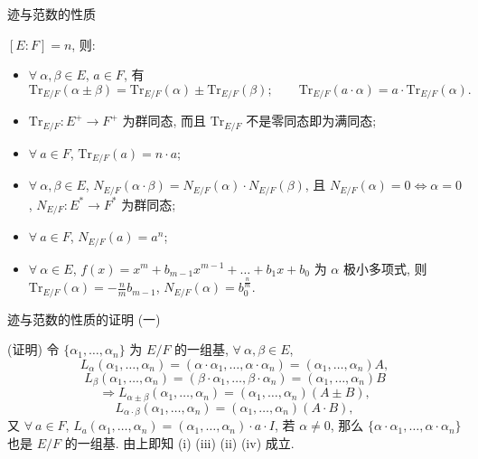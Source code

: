 \begin{frame}{迹与范数的性质}

\begin{lem}[迹与范数的性质]
$[E:F] = n$, 则:
\begin{itemize}
\item[(i)] $\forall\ \alpha, \beta \in E$, $a \in F$, 有
  \[
  \mathrm{Tr}_{E/F}(\alpha \pm \beta) = \mathrm{Tr}_{E/F}(\alpha)
  \pm \mathrm{Tr}_{E/F}(\beta); \qquad
  \mathrm{Tr}_{E/F}(a \cdot \alpha) = a \cdot \mathrm{Tr}_{E/F}(\alpha).
  \]
\item[(ii)] $\mathrm{Tr}_{E/F}: E^{+} \to F^{+}$ 为群同态,
  而且 $\mathrm{Tr}_{E/F}$ 不是零同态即为满同态;
\item[(iii)] $\forall\ a \in F$, $\mathrm{Tr}_{E/F}(a) = n \cdot a$;
\item[(iv)] $\forall\ \alpha, \beta \in E$,
  $N_{E/F}(\alpha \cdot \beta) = N_{E/F}(\alpha) \cdot N_{E/F}(\beta)$,
  且 $N_{E/F}(\alpha) = 0 \iff \alpha = 0$,
  $N_{E/F}: E^{*} \to F^{*}$ 为群同态;
\item[(v)] $\forall\ a \in F$, $N_{E/F}(a) = a^n$;
\item[(vi)] $\forall\ \alpha \in E$,
  $f(x) = x^m + b_{m-1}x^{m-1} + \dots + b_1 x + b_0$ 为 $\alpha$
  极小多项式, 则 $\mathrm{Tr}_{E/F}(\alpha) = -\frac{n}{m} b_{m-1}$,
  $N_{E/F}(\alpha) = b_0^{\frac{n}{m}}$.
\end{itemize}
\end{lem}

\end{frame}


\begin{frame}{迹与范数的性质的证明 (一)}

\startproof[bg=yellow, fg=red](证明)
令 $\{ \alpha_1, \dots, \alpha_n \}$ 为 $E/F$ 的一组基, $\forall\ \alpha, \beta \in E$,
\[
L_\alpha(\alpha_1, \dots, \alpha_n) = (\alpha \cdot \alpha_1, \dots, \alpha \cdot \alpha_n)
= (\alpha_1, \dots, \alpha_n)A,
\]
\[
L_\beta(\alpha_1, \dots, \alpha_n) = (\beta \cdot \alpha_1, \dots, \beta \cdot \alpha_n)
= (\alpha_1, \dots, \alpha_n)B
\]
\[
\Longrightarrow L_{\alpha \pm \beta}(\alpha_1, \dots, \alpha_n)
= (\alpha_1, \dots, \alpha_n)(A \pm B),
\]
\[
L_{\alpha \cdot \beta}(\alpha_1, \dots, \alpha_n) = (\alpha_1, \dots, \alpha_n)(A \cdot B),
\]
又 $\forall\ a \in F$, $L_a(\alpha_1, \dots, \alpha_n) = (\alpha_1, \dots, \alpha_n) \cdot a \cdot I$,
若 $\alpha \neq 0$, 那么 $\{ \alpha \cdot \alpha_1, \dots, \alpha \cdot \alpha_n \}$
也是 $E/F$ 的一组基.
由上即知 (i) (iii) (ii) (iv) 成立.

\end{frame}

